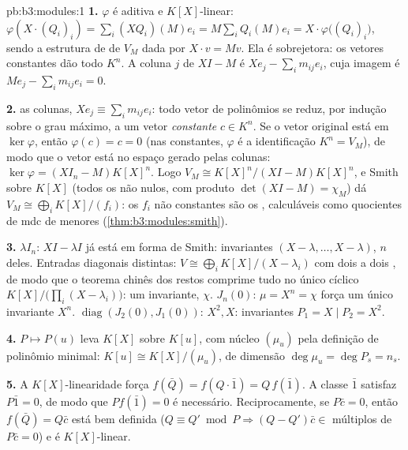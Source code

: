 \begin{solution}{pb:b3:modules:1}
\textbf{1.} $\varphi$ é aditiva e $K[X]$-linear: $\varphi(X
\cdot (Q_i)_i) = \sum_i (XQ_i)(M)e_i = M\sum_i Q_i(M)e_i = X
\cdot \varphi\bigl((Q_i)_i\bigr)$, sendo a estrutura
de  de $V_M$ dada por $X \cdot v = Mv$. Ela é sobrejetora: os vetores
constantes dão todo $K^n$. A coluna $j$ de $XI - M$ é $Xe_j - \sum_i
m_{ij}e_i$,
cuja imagem é $Me_j - \sum_i m_{ij}e_i = 0$.

\textbf{2.}  as colunas, $Xe_j \equiv \sum_i m_{ij}e_i$: todo vetor de polinômios se reduz,
por indução sobre o grau máximo, a um vetor \emph{constante} $c \in K^n$. Se o
vetor original está em $\ker\varphi$, então $\varphi(c) = c = 0$ (nas constantes, $\varphi$ é a
identificação $K^n = V_M$), de modo que o vetor está no espaço gerado pelas
colunas: $\ker\varphi = (XI_n -
M)K[X]^n$. Logo $V_M \cong K[X]^n/(XI - M)K[X]^n$, e Smith sobre $K[X]$ (todos os  não nulos, com produto $\det(XI - M) = \chi_M$) dá $V_M \cong \bigoplus_i
K[X]/(f_i)$: os $f_i$ não
constantes são os , calculáveis como quocientes
de mdc de menores (\cref{thm:b3:modules:smith}).

\textbf{3.} $\lambda I_n$: $XI - \lambda I$ já está em forma de Smith: invariantes $(X - \lambda, \dots, X - \lambda)$,
$n$ deles. Entradas diagonais distintas: $V \cong \bigoplus_i K[X]/(X -
\lambda_i)$ com  dois a
dois , de modo que o teorema chinês dos restos comprime tudo no
único cíclico $K[X]/\bigl(\prod_i(X - \lambda_i)\bigr)$: um invariante, $\chi$. $J_n(0)$: $\mu = X^n = \chi$ força
um único invariante $X^n$. $\operatorname{diag}(J_2(0), J_1(0))$:  $X^2, X$:
invariantes $P_1 = X \mid P_2 =
X^2$.

\textbf{4.} $P \mapsto P(u)$ leva $K[X]$ sobre $K[u]$, com núcleo $(\mu_u)$ pela
definição de polinômio minimal: $K[u]
\cong K[X]/(\mu_u)$, de dimensão $\deg\mu_u = \deg P_s = n_s$.

\textbf{5.} A $K[X]$-linearidade força $f(\bar Q) = f(Q\cdot\bar 1)
= Q\,f(\bar 1)$. A classe $\bar 1$
satisfaz $P \bar 1 = 0$, de modo que $P f(\bar 1) = 0$ é necessário. Reciprocamente, se $P\bar c = 0$,
então $f(\bar Q) = Q\bar c$ está bem definida ($Q \equiv Q' \bmod P
\Rightarrow (Q - Q')\bar c \in$ múltiplos de $P\bar c = 0$) e é
$K[X]$-linear.


\end{solution}
